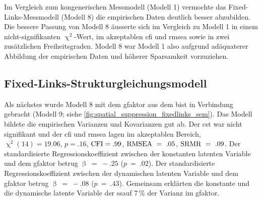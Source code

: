 \documentclass[11pt, twoside, a4paper]{book}		%
\begin{document}
Im Vergleich zum kongenerischen Messmodell (Modell 1) vermochte das Fixed-Links-Messmodell (Modell 8) die empirischen Daten deutlich besser abzubilden. Die bessere Passung von Modell 8 äusserte sich im Vergleich zu Modell 1 in einem nicht-signifikanten $\upchi^2$-Wert, im akzeptablen \gls{cfi} und \gls{rmsea} sowie in zwei zusätzlichen Freiheitsgraden. Modell 8 war Modell 1 also aufgrund adäquaterer Abbildung der empirischen Daten und höherer Sparsamkeit vorzuziehen.



\subsection{Fixed-Links-Strukturgleichungsmodell}

Als nächstes wurde Modell 8 mit dem \gls{gfaktor} aus dem \gls{bist} in Verbindung gebracht (Modell 9; siehe \autoref{fig:spatial_suppression_fixedlinks_sem}).
Das Modell bildete die empirischen Varianzen und Kovarianzen gut ab. Der \gls{cst} war nicht signifikant und der \gls{cfi} und \gls{rmsea} lagen im akzeptablen Bereich, $\upchi^2(14)=19.06$, $p=.16$, $\textnormal{CFI}=.99$, $\textnormal{RMSEA}~=~.05$, $\textnormal{SRMR}~=~.09$. 
Der standardisierte Regressionskoeffizient zwischen der konstanten latenten Variable und dem \gls{gfaktor} betrug $\upbeta~=~-.25$ ($p~=~.02$). Der standardisierte Regressionskoeffizient zwischen der dynamischen latenten Variable und dem \gls{gfaktor} betrug $\upbeta~=~-.08$ ($p~=~.43$).
Gemeinsam erklärten die konstante und die dynamische latente Variable der \gls{ssauf} $7\,\%$ der Varianz im \gls{gfaktor}.
\end{document}
